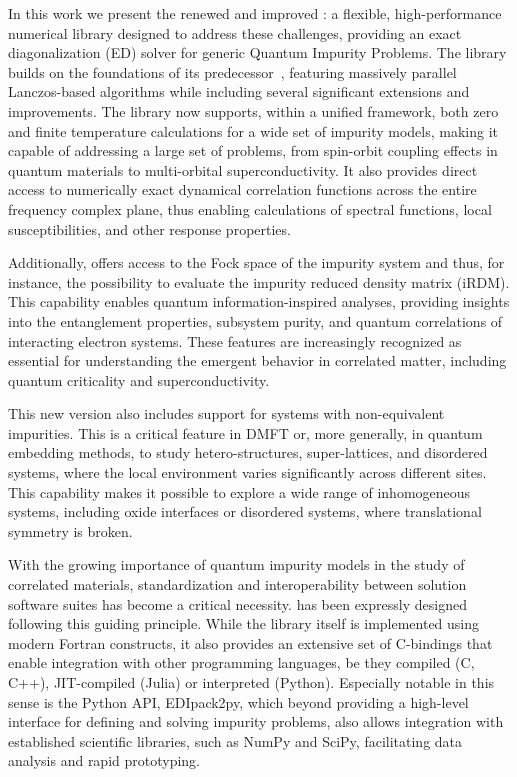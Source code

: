 \documentclass[edipack_sp.tex]{subfiles}
\begin{document}
In this work we present the renewed and improved \NAME{}: a flexible, high-performance numerical library designed to address these challenges, providing an exact diagonalization (ED) solver for generic Quantum Impurity Problems. 
The library builds on the foundations of
its predecessor~\cite{amaricci2022CPC}, featuring massively parallel Lanczos-based algorithms while including several significant extensions and improvements. The library now supports, within a unified framework, both zero and finite temperature calculations for a wide set of impurity models, making it capable of addressing a large set of problems, from spin-orbit coupling effects in quantum materials to multi-orbital superconductivity. It also provides direct
access to numerically exact
dynamical correlation functions across the
entire frequency complex plane, thus enabling calculations of spectral functions, local susceptibilities, and other response properties.

Additionally, \NAME offers access to the Fock space of
the impurity system and thus, for instance, the possibility to evaluate the impurity reduced density matrix
(iRDM). This capability enables quantum information-inspired analyses, providing insights into the entanglement properties, subsystem purity, and quantum correlations of interacting electron systems. These
features are increasingly recognized as essential for understanding the emergent behavior in correlated matter, including quantum criticality and superconductivity.

This new version also includes support for systems with non-equivalent impurities. This is a critical feature in DMFT or, more generally, in quantum embedding methods, to study hetero-structures, super-lattices, and disordered systems, where the local environment varies significantly across different sites. This capability makes it 
possible to explore a wide range of inhomogeneous systems, including
oxide interfaces or disordered systems, where
translational symmetry is broken.

With the growing importance of  quantum impurity models in the study of correlated materials,
standardization and interoperability between solution software suites has
become a critical necessity.
\NAME has been expressly designed following this guiding principle. 
While the library itself is implemented using modern Fortran constructs, it also provides an extensive set of C-bindings that enable integration with other programming languages,
be they compiled (C, C++), JIT-compiled (Julia) or interpreted (Python). 
Especially notable in this sense is the Python API, EDIpack2py, which beyond providing a 
high-level interface for defining and solving impurity problems, also allows integration with established scientific libraries, such as NumPy and SciPy, facilitating data analysis and
rapid prototyping.
\end{document}

